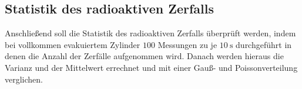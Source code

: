 \subsection{Statistik des radioaktiven Zerfalls}
Anschließend soll die Statistik des radioaktiven Zerfalls überprüft werden, indem bei vollkommen evakuiertem Zylinder $100$ Messungen zu je $\SI{10}{\second}$ durchgeführt in denen die Anzahl der Zerfälle aufgenommen wird. Danach werden hieraus die Varianz und der Mittelwert errechnet und mit einer Gauß- und Poissonverteilung verglichen. 